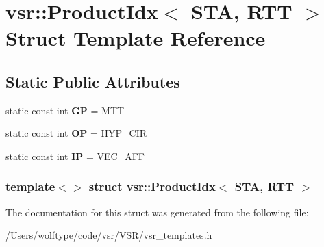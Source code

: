 \hypertarget{structvsr_1_1_product_idx_3_01_s_t_a_00_01_r_t_t_01_4}{\section{vsr\-:\-:Product\-Idx$<$ S\-T\-A, R\-T\-T $>$ Struct Template Reference}
\label{structvsr_1_1_product_idx_3_01_s_t_a_00_01_r_t_t_01_4}
}
\subsection*{Static Public Attributes}
\begin{DoxyCompactItemize}
\item 
\hypertarget{structvsr_1_1_product_idx_3_01_s_t_a_00_01_r_t_t_01_4_a53a7932741260792b73f407fe7b423cd}{static const int {\bfseries G\-P} = M\-T\-T}\label{structvsr_1_1_product_idx_3_01_s_t_a_00_01_r_t_t_01_4_a53a7932741260792b73f407fe7b423cd}

\item 
\hypertarget{structvsr_1_1_product_idx_3_01_s_t_a_00_01_r_t_t_01_4_ad9154827e44b1af3f8047c82d7dc18cc}{static const int {\bfseries O\-P} = H\-Y\-P\-\_\-\-C\-I\-R}\label{structvsr_1_1_product_idx_3_01_s_t_a_00_01_r_t_t_01_4_ad9154827e44b1af3f8047c82d7dc18cc}

\item 
\hypertarget{structvsr_1_1_product_idx_3_01_s_t_a_00_01_r_t_t_01_4_a54cb3c8c3d2c5b2dc7bcf6b4a7a368ab}{static const int {\bfseries I\-P} = V\-E\-C\-\_\-\-A\-F\-F}\label{structvsr_1_1_product_idx_3_01_s_t_a_00_01_r_t_t_01_4_a54cb3c8c3d2c5b2dc7bcf6b4a7a368ab}

\end{DoxyCompactItemize}
\subsubsection*{template$<$$>$ struct vsr\-::\-Product\-Idx$<$ S\-T\-A, R\-T\-T $>$}



The documentation for this struct was generated from the following file\-:\begin{DoxyCompactItemize}
\item 
/\-Users/wolftype/code/vsr/\-V\-S\-R/vsr\-\_\-templates.\-h\end{DoxyCompactItemize}
